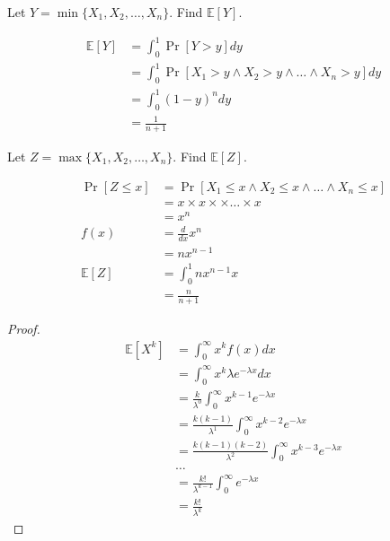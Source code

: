 \documentclass[11pt]{article}
\newcommand{\E}[0]{\mathbb{E}}
\begin{document}
\begin{Parts}
    
    \Part Let $Y = \min\{X_1, X_2, \ldots, X_n\}$. Find $\E[Y]$. 

    \begin{Answer}
        \begin{align*}
            \E[Y] &= \int_0^1 \Pr[Y > y]dy \\
                  &= \int_0^1 \Pr[X_1 > y \land X_2 > y \land \ldots \land X_n > y]dy \\
                  &= \int_0^1 (1 - y)^n dy \\
                  &= \frac{1}{n+1}
        \end{align*}
    \end{Answer}

    \Part Let $Z = \max\{X_1, X_2, \ldots, X_n\}$. Find $\E[Z]$. 

    \begin{Answer}
        \begin{align*}
            \Pr[Z \leq x] &= \Pr[X_1 \leq x \land X_2 \leq x \land \ldots \land X_n \leq x] \\
                          &= x \times x \times \times \ldots \times x \\
                          &= x^n \\
            f(x)          &= \frac{d}{dx} x^n \\
                          &= nx^{n-1} \\
            \E[Z]         &= \int_0^1 nx^{n-1}x \\
                          &= \frac{n}{n+1} 
        \end{align*}
    \end{Answer}

\end{Parts}

\newpage
{}

\begin{Answer}
    \begin{proof}
        \begin{align*}
            \E[X^k] &= \int_0^{\infty} x^kf(x)dx \\
                    &= \int_0^{\infty} x^k\lambda e^{-\lambda x}dx \\
                    &= \frac{k}{\lambda^0}\int_0^{\infty} x^{k-1}e^{-\lambda x} \\
                    &= \frac{k(k-1)}{\lambda^1}\int_0^{\infty}x^{k-2}e^{-\lambda x} \\
                    &= \frac{k(k-1)(k-2)}{\lambda^2}\int_0^{\infty}x^{k-3}e^{-\lambda x} \\
                    &\ldots \\
                    &= \frac{k!}{\lambda^{k-1}}\int_0^{\infty} e^{-\lambda x} \\
                    &= \frac{k!}{\lambda^k}
        \end{align*}
    \end{proof}
\end{Answer}
\end{document}
